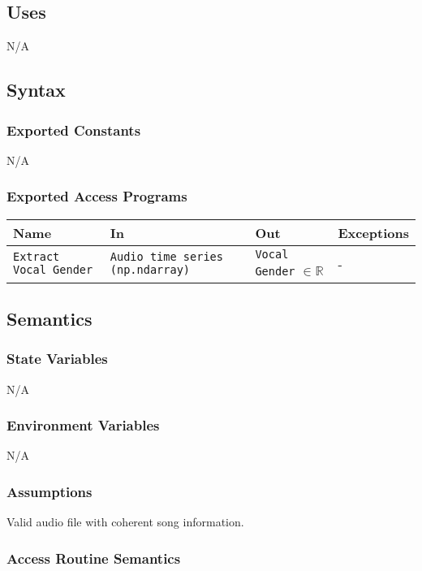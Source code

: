 \documentclass[12pt, titlepage]{article}
\begin{document}
\subsection{Uses}
N/A

\subsection{Syntax}

\subsubsection{Exported Constants}
N/A

\subsubsection{Exported Access Programs}

\begin{center}
\begin{tabular}{p{2cm} p{4cm} p{4cm} p{2cm}}
\hline
\textbf{Name} & \textbf{In} & \textbf{Out} & \textbf{Exceptions}\\
\hline%
\texttt{Extract Vocal Gender} &\texttt{Audio time series (np.ndarray)} &\texttt{Vocal Gender} $\in \mathbb{R}$ &-\\
\hline
\end{tabular}
\end{center}

\subsection{Semantics}

\subsubsection{State Variables}
N/A

\subsubsection{Environment Variables}
N/A

\subsubsection{Assumptions}
Valid audio file with coherent song information.

\subsubsection{Access Routine Semantics}
\end{document}

